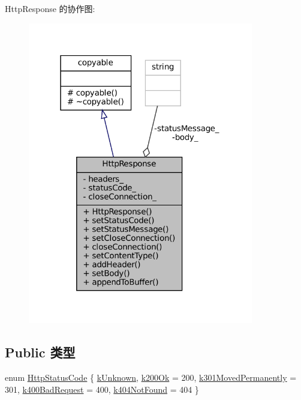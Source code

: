 Http\+Response 的协作图\+:
\nopagebreak
\begin{figure}[H]
\begin{center}
\leavevmode
\includegraphics[width=279pt]{classmuduo_1_1net_1_1HttpResponse__coll__graph}
\end{center}
\end{figure}
\subsection*{Public 类型}
\begin{DoxyCompactItemize}
\item 
enum \hyperlink{classmuduo_1_1net_1_1HttpResponse_ab80f66127508dfced7a0fe1929fe12cc}{Http\+Status\+Code} \{ \newline
\hyperlink{classmuduo_1_1net_1_1HttpResponse_ab80f66127508dfced7a0fe1929fe12cca8e792321b79a4aa90e75bd3fcc2e4141}{k\+Unknown}, 
\hyperlink{classmuduo_1_1net_1_1HttpResponse_ab80f66127508dfced7a0fe1929fe12ccacc16172506513cb34185a4ad8cc52a74}{k200\+Ok} = 200, 
\hyperlink{classmuduo_1_1net_1_1HttpResponse_ab80f66127508dfced7a0fe1929fe12cca91181029534d5b787040014b7bcd44b5}{k301\+Moved\+Permanently} = 301, 
\hyperlink{classmuduo_1_1net_1_1HttpResponse_ab80f66127508dfced7a0fe1929fe12ccafd0f0a5c71ac33577ba3595a4c3e36f2}{k400\+Bad\+Request} = 400, 
\newline
\hyperlink{classmuduo_1_1net_1_1HttpResponse_ab80f66127508dfced7a0fe1929fe12ccaa600536cd5144b0769bb47ee6029d955}{k404\+Not\+Found} = 404
 \}
\end{DoxyCompactItemize}
